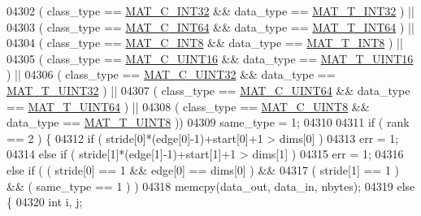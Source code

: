 \begin{DoxyCode}
{{{{{{{{{{{{{{{{{{{{{{{{{04302         ( class\_type == \hyperlink{group___m_a_t_ggad4d60ae7b709fc81bfd744fb4c857c40adb44fc39694e3152ae5e69470a2fefe8}{MAT\_C\_INT32} && data\_type == \hyperlink{group___m_a_t_ggacf7b3b879282b7ab3a51190e49bf3453a83e06a68320726c6572bfbb9f3addb1d}{MAT\_T\_INT32} ) ||
04303         ( class\_type == \hyperlink{group___m_a_t_ggad4d60ae7b709fc81bfd744fb4c857c40a1ea83bcde49b35477494412973f82409}{MAT\_C\_INT64} && data\_type == \hyperlink{group___m_a_t_ggacf7b3b879282b7ab3a51190e49bf3453a9e825b5d18b8f946eaf2b4b57e51c145}{MAT\_T\_INT64} ) ||
04304         ( class\_type == \hyperlink{group___m_a_t_ggad4d60ae7b709fc81bfd744fb4c857c40a984ff310f9e906100fcff95f704f43c5}{MAT\_C\_INT8} && data\_type == \hyperlink{group___m_a_t_ggacf7b3b879282b7ab3a51190e49bf3453a9807f5033ed4f9b548953742d9fd1658}{MAT\_T\_INT8} ) ||
04305         ( class\_type == \hyperlink{group___m_a_t_ggad4d60ae7b709fc81bfd744fb4c857c40a8bede21dbf6c1edc0bbccc1481bccae7}{MAT\_C\_UINT16} && data\_type == \hyperlink{group___m_a_t_ggacf7b3b879282b7ab3a51190e49bf3453a05bc7af7680aa68be95126ae0a4c2e31}{MAT\_T\_UINT16} ) ||
04306         ( class\_type == \hyperlink{group___m_a_t_ggad4d60ae7b709fc81bfd744fb4c857c40a9a17a7edd45b19ef68197db81b27e816}{MAT\_C\_UINT32} && data\_type == \hyperlink{group___m_a_t_ggacf7b3b879282b7ab3a51190e49bf3453aa397e285a23fe240368b752897652c6a}{MAT\_T\_UINT32} ) ||
04307         ( class\_type == \hyperlink{group___m_a_t_ggad4d60ae7b709fc81bfd744fb4c857c40a86470e25c3763d9a24623f04326195dd}{MAT\_C\_UINT64} && data\_type == \hyperlink{group___m_a_t_ggacf7b3b879282b7ab3a51190e49bf3453a45547932c46be27118abe08302d7e29f}{MAT\_T\_UINT64} ) ||
04308         ( class\_type == \hyperlink{group___m_a_t_ggad4d60ae7b709fc81bfd744fb4c857c40a81270f8093cb4808e992c1d29d84d4e3}{MAT\_C\_UINT8} && data\_type == \hyperlink{group___m_a_t_ggacf7b3b879282b7ab3a51190e49bf3453a01c1bd7db68f90552862eb5d311be408}{MAT\_T\_UINT8} ))
04309         same\_type = 1;
04310 
04311     \textcolor{keywordflow}{if} ( rank == 2 ) \{
04312         \textcolor{keywordflow}{if} ( stride[0]*(edge[0]-1)+start[0]+1 > dims[0] )
04313             err = 1;
04314         \textcolor{keywordflow}{else} \textcolor{keywordflow}{if} ( stride[1]*(edge[1]-1)+start[1]+1 > dims[1] )
04315             err = 1;
04316         \textcolor{keywordflow}{else} \textcolor{keywordflow}{if} ( ( stride[0] == 1 && edge[0] == dims[0] ) &&
04317                   ( stride[1] == 1 ) && ( same\_type == 1 ) )
04318             memcpy(data\_out, data\_in, nbytes);
04319         \textcolor{keywordflow}{else} \{
04320             \textcolor{keywordtype}{int} i, j;
}}}}}}}}}}}}}}}}}}}}}}}}}
\end{DoxyCode}
